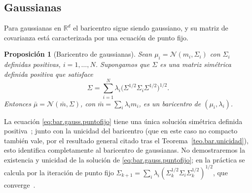 \documentclass[12pt, a4paper]{amsbook}
\newcommand{\R}{{\mathbb R}}
\newtheorem{prop}[teo]{Proposición}
\theoremstyle{remark}
\theoremstyle{definition}
\numberwithin{section}{chapter}
\numberwithin{subsection}{section}
\numberwithin{equation}{section}
\numberwithin{figure}{chapter}
\begin{document}
\subsection{Gaussianas}

Para gaussianas en $\R^d$ el baricentro sigue siendo gaussiano, y su matriz de
covarianza está caracterizada por una ecuación de punto fijo.

\begin{prop}[Baricentro de gaussianas]\label{prop.bar.gauss}
Sean $\mu_i=\mathcal N(m_i,\Sigma_i)$ con $\Sigma_i$ definidas positivas,
$i=1,\dots,N$. Supongamos que $\Sigma$ es una matriz simétrica definida
positiva que satisface
\begin{equation}\label{eq:bar.gauss.puntofijo}
\Sigma=\sum_{i=1}^N\lambda_i\bigl(\Sigma^{1/2}\Sigma_i\Sigma^{1/2}\bigr)^{1/2}.
\end{equation}
Entonces $\bar\mu=\mathcal N(\bar m,\Sigma)$, con $\bar m=\sum_i\lambda_im_i$,
es un baricentro de $(\mu_i,\lambda_i)$.
\end{prop}

La ecuación \eqref{eq:bar.gauss.puntofijo} tiene una única solución simétrica
definida positiva~\cite[Theorem~6.1]{AguehCarlier2011}; junto con la unicidad
del baricentro (que en este caso no compacto también vale, por el resultado
general citado tras el Teorema~\ref{teo.bar.unicidad}), esto identifica
completamente al baricentro de gaussianas. No demostraremos la existencia y
unicidad de la solución de \eqref{eq:bar.gauss.puntofijo}; en la práctica se
calcula por la iteración de punto fijo
$\Sigma_{k+1}=\sum_i\lambda_i(\Sigma_k^{1/2}\Sigma_i\Sigma_k^{1/2})^{1/2}$, que
converge~\cite{AlvarezEsteban2016}.
\end{document}
